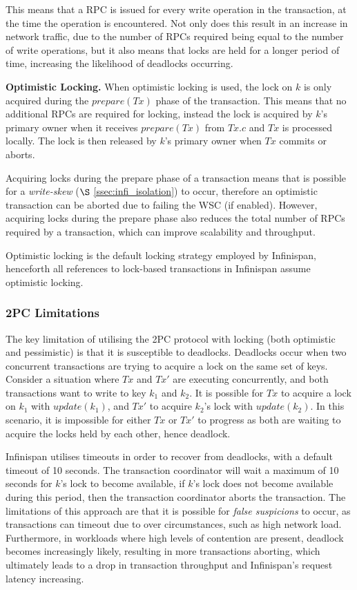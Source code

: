             This means that a RPC is issued for every write operation in the transaction, at the time the operation is encountered.  Not only does this result in an increase in network traffic, due to the number of RPCs required being equal to the number of write operations, but it also means that locks are held for a longer period of time, increasing the likelihood of deadlocks occurring.  
            
	        \textbf{Optimistic Locking.}
	        When optimistic locking\citep{Kung:1981:OMC:319566.319567} is used, the lock on $k$ is only acquired during the $prepare(Tx)$ phase of the transaction.  This means that no additional RPCs are required for locking, instead the lock is acquired by $k$'s primary owner when it receives $prepare(Tx)$ from $Tx.c$ and $Tx$ is processed locally.  The lock is then released by $k$'s primary owner when $Tx$ commits or aborts.  
	        
	        Acquiring locks during the prepare phase of a transaction means that is possible for a  \emph{write-skew} ($\S$ \ref{ssec:infi_isolation}) to occur, therefore an optimistic transaction can be aborted due to failing the WSC (if enabled).  However, acquiring locks during the prepare phase also reduces the total number of RPCs required by a transaction, which can improve scalability and throughput.  
	        
	        Optimistic locking is the default locking strategy employed by Infinispan, henceforth all references to lock-based transactions in Infinispan assume optimistic locking.  
	        
	        \subsubsection*{2PC Limitations}
	        The key limitation of utilising the 2PC protocol with locking (both optimistic and pessimistic) is that it is susceptible to deadlocks.  Deadlocks occur when two concurrent transactions are trying to acquire a lock on the same set of keys.  Consider a situation where $Tx$ and $Tx'$ are executing concurrently, and both transactions want to write to key $k_1$ and $k_2$.  It is possible for $Tx$ to acquire a lock on $k_1$ with $update(k_1)$, and $Tx'$ to acquire $k_2$'s lock with $update(k_2)$.  In this scenario, it is impossible for either $Tx$ or $Tx'$ to progress as both are waiting to acquire the locks held by each other, hence deadlock.  
	        
	        Infinispan utilises timeouts in order to recover from deadlocks, with a default timeout of 10 seconds.  The transaction coordinator will wait a maximum of 10 seconds for $k$'s lock to become available, if $k$'s lock does not become available during this period, then the transaction coordinator aborts the transaction.  The limitations of this approach are that it is possible for \emph{false suspicions} to occur, as transactions can timeout due to over circumstances, such as high network load.  Furthermore, in workloads where high levels of contention are present, deadlock becomes increasingly likely, resulting in more transactions aborting, which ultimately leads to a drop in transaction throughput and Infinispan's request latency increasing.  

